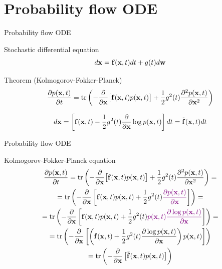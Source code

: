 \section{Probability flow ODE}
\begin{frame}{Probability flow ODE}
	\begin{block}{Stochastic differential equation}
		\[
			d\mathbf{x} = \mathbf{f}(\mathbf{x}, t) dt + g(t) d \mathbf{w}
		\] 	
	\end{block}
	\begin{block}{Theorem (Kolmogorov-Fokker-Planck)}
 		\vspace{-0.2cm}
 		\[
 			\frac{\partial p(\mathbf{x}, t)}{\partial t} = \text{tr}\left(- \frac{\partial}{\partial \mathbf{x}} \bigl[ \mathbf{f}(\mathbf{x}, t) p(\mathbf{x}, t)\bigr] + \frac{1}{2} g^2(t) \frac{\partial^2 p(\mathbf{x}, t)}{\partial \mathbf{x}^2} \right)
 		\]
 	\end{block}
		\[
			d\mathbf{x} = \left[\mathbf{f}(\mathbf{x}, t) -\frac{1}{2} g^2(t) \frac{\partial}{\partial \mathbf{x}} \log p(\mathbf{x}, t) \right] dt = \tilde{\mathbf{f}}(\mathbf{x}, t) dt
		\] 	
\end{frame}
\begin{frame}{Probability flow ODE}
	\begin{block}{Kolmogorov-Fokker-Planck equation}
 		\vspace{-0.2cm}
 		\begin{multline*}
 			\frac{\partial p(\mathbf{x}, t)}{\partial t} = \text{tr}\left(- \frac{\partial}{\partial \mathbf{x}} \bigl[ \mathbf{f}(\mathbf{x}, t) p(\mathbf{x}, t)\bigr] + \frac{1}{2} g^2(t) \frac{\partial^2 p(\mathbf{x}, t)}{\partial \mathbf{x}^2} \right) = \\
 			=  \text{tr}\left(- \frac{\partial}{\partial \mathbf{x}} \left[ \mathbf{f}(\mathbf{x}, t) p(\mathbf{x}, t) + \frac{1}{2} g^2(t) {\color{violet}\frac{\partial p(\mathbf{x}, t)}{\partial \mathbf{x}}} \right]  \right) = \\
 			 =  \text{tr}\left(- \frac{\partial}{\partial \mathbf{x}} \left[ \mathbf{f}(\mathbf{x}, t) p(\mathbf{x}, t) + \frac{1}{2} g^2(t) {\color{violet}p(\mathbf{x}, t) \frac{\partial \log p(\mathbf{x}, t)}{\partial \mathbf{x}}} \right]  \right)= \\
 			  =  \text{tr}\left(- \frac{\partial}{\partial \mathbf{x}} \left[ \left( \mathbf{f}(\mathbf{x}, t) + \frac{1}{2} g^2(t) \frac{\partial \log p(\mathbf{x}, t)}{\partial \mathbf{x}}\right) p(\mathbf{x}, t) \right]  \right)\\
 			  =  \text{tr}\left(- \frac{\partial}{\partial \mathbf{x}} \left[ \tilde{\mathbf{f}}(\mathbf{x}, t) p(\mathbf{x}, t) \right]  \right)
 		\end{multline*}
 	\end{block}
\end{frame}
